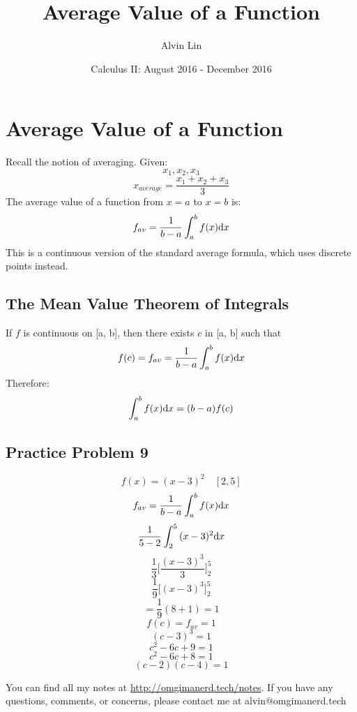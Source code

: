 \documentclass[letterpaper, 12pt]{math}
\title{Average Value of a Function}
\author{Alvin Lin}
\date{Calculus II: August 2016 - December 2016}
\begin{document}
\maketitle

\section*{Average Value of a Function}
Recall the notion of averaging. Given:
\[ x_{1}, x_{2}, x_{3} \]
\[ x_{average} = \frac{x_{1}+x_{2}+x_{3}}{3} \]
The average value of a function from \( x = a \) to \( x = b \) is:
\[ f_{av} = \frac{1}{b-a}\int_{a}^{b}{f(x)\mathrm{d}{x}} \]
This is a continuous version of the standard average formula, which uses
discrete points instead.

\subsection*{The Mean Value Theorem of Integrals}
If \( f \) is continuous on [a, b], then there exists \( c \) in [a, b] such
that
\[ f(c) = f_{av} = \frac{1}{b-a}\int_{a}^{b}{f(x)\mathrm{d}{x}} \]
Therefore:
\[ \int_{a}^{b}{f(x)\mathrm{d}{x}} = (b-a)f(c) \]

\subsection*{Practice Problem 9}
\[ f(x) = (x-3)^{2} \quad [2, 5] \]
\[ f_{av} = \frac{1}{b-a}\int_{a}^{b}{f(x)\mathrm{d}{x}} \]
\[ \frac{1}{5-2}\int_{2}^{5}{(x-3)^{2}\mathrm{d}{x}} \]
\[ \frac{1}{3}\bigg[\frac{(x-3)^{3}}{3}\bigg]_{2}^{5} \]
\[ \frac{1}{9}\bigg[(x-3)^{3}]_{2}^{5} \]
\[ = \frac{1}{9}(8+1) = 1 \]
\[ f(c) = f_{av} = 1 \]
\[ (c-3)^{3} = 1 \]
\[ c^{2}-6c+9 = 1 \]
\[ c^{2}-6c+8 = 1 \]
\[ (c-2)(c-4) = 1 \]

\begin{center}
  You can find all my notes at \url{http://omgimanerd.tech/notes}. If you have
  any questions, comments, or concerns, please contact me at
  alvin@omgimanerd.tech
\end{center}
\end{document}
